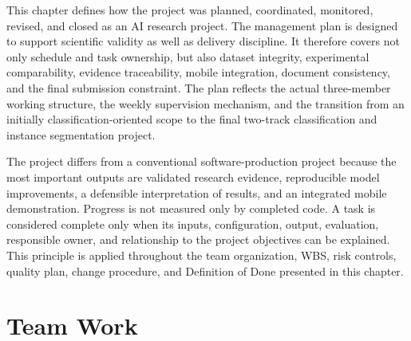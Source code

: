 This chapter defines how the project was planned, coordinated, monitored, revised, and closed as an AI research project. The management plan is designed to support scientific validity as well as delivery discipline. It therefore covers not only schedule and task ownership, but also dataset integrity, experimental comparability, evidence traceability, mobile integration, document consistency, and the final submission constraint. The plan reflects the actual three-member working structure, the weekly supervision mechanism, and the transition from an initially classification-oriented scope to the final two-track classification and instance segmentation project.\par
The project differs from a conventional software-production project because the most important outputs are validated research evidence, reproducible model improvements, a defensible interpretation of results, and an integrated mobile demonstration. Progress is not measured only by completed code. A task is considered complete only when its inputs, configuration, output, evaluation, responsible owner, and relationship to the project objectives can be explained. This principle is applied throughout the team organization, WBS, risk controls, quality plan, change procedure, and Definition of Done presented in this chapter.\par
\section{Team Work}
